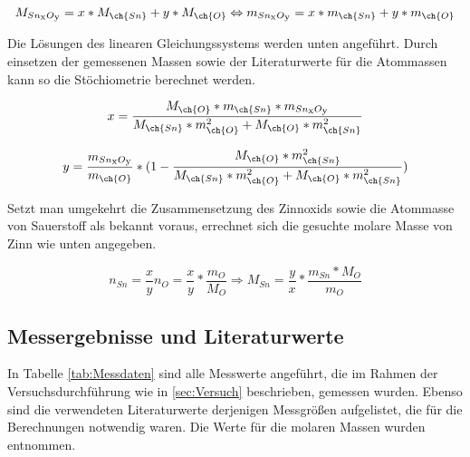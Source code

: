\documentclass{article}
\begin{document}
      \begin{equation}
        M_{Sn\textsubscript{x}O\textsubscript{y}} = x * M_{\ch{Sn}} + y * M_{\ch{O}}  \Leftrightarrow m_{Sn\textsubscript{x}O\textsubscript{y}} = x * m_{\ch{Sn}} + y * m_{\ch{O}} \label{eq:Molmasse}
      \end{equation} 
      
      Die Lösungen des linearen Gleichungssystems werden unten angeführt. Durch einsetzen der gemessenen Massen sowie der Literaturwerte für die Atommassen kann so die Stöchiometrie berechnet werden. 
      
      \begin{equation}
        x = \frac{M_{\ch{O}} * m_{\ch{Sn}} * m_{Sn\textsubscript{x}O\textsubscript{y}}}{M_{\ch{Sn}} * m_{\ch{O}}^2 + M_{\ch{O}} * m_{\ch{Sn}}^2} \label{eq:x}
      \end{equation}
      
      \begin{equation}
        y = \frac{m_{Sn\textsubscript{x}O\textsubscript{y}}}{m_{\ch{O}}} * (1 - \frac{M_{\ch{O}} * m_{\ch{Sn}}^2}{M_{\ch{Sn}} * m_{\ch{O}}^2 + M_{\ch{O}} * m_{\ch{Sn}}^2}) \label{eq:y}
      \end{equation}
      
      Setzt man umgekehrt die Zusammensetzung des Zinnoxids sowie die Atommasse von Sauerstoff als bekannt voraus, errechnet sich die gesuchte molare Masse von Zinn wie unten angegeben.
      
      \begin{equation}
        n_{Sn} = \frac{x}{y}n_{O} = \frac{x}{y} * \frac{m_{O}}{M_{O}} \Rightarrow M_{Sn} = \frac{y}{x} * \frac{m_{Sn}*M_{O}}{m_{O}} \label{eq:Mol}
      \end{equation}
      
    \subsection{Messergebnisse und Literaturwerte}
    
      In Tabelle \ref{tab:Messdaten} sind alle Messwerte angeführt, die im Rahmen der Versuchsdurchführung wie in \ref{sec:Versuch} beschrieben, gemessen wurden. Ebenso sind die verwendeten Literaturwerte derjenigen Messgrößen aufgelistet, die für die Berechnungen notwendig waren. Die Werte für die molaren Massen wurden \cite{Atommassentabelle} entnommen. 
      
\end{document}
